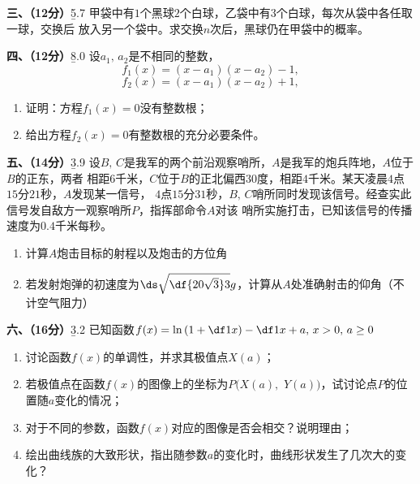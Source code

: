 \begin{frame}
	\linespread{1.5}
	\begin{exampleblock}{{\bf 三、（12分）}\hfill{\b 5.7}}
		甲袋中有$1$个黑球$2$个白球，乙袋中有$3$个白球，每次从袋中各任取一球，交换后
		放入另一个袋中。求交换$n$次后，黑球仍在甲袋中的概率。
	\end{exampleblock}
\end{frame}

\begin{frame}
	\linespread{1.2}
	\begin{exampleblock}{{\bf 四、（12分）}\hfill{\b 8.0}}
		设$a_1,\,a_2$是不相同的整数，
		$$f_1(x)=(x-a_1)(x-a_2)-1,$$
		$$f_2(x)=(x-a_1)(x-a_2)+1,$$
		\vspace{-1em}\pause
		\begin{enumerate}
		  \item 证明：方程$f_1(x)=0$没有整数根；\pause
		  \item 给出方程$f_2(x)=0$有整数根的充分必要条件。
		\end{enumerate}
	\end{exampleblock}
\end{frame}

\begin{frame}
	\linespread{1.0}
	\begin{exampleblock}{{\bf 五、（14分）}\hfill\hfill{\b 3.9}}
		设$B,\,C$是我军的两个前沿观察哨所，$A$是我军的炮兵阵地，$A$位于$B$的正东，两者
		相距$6$千米，$C$位于$B$的正北偏西$30$度，相距$4$千米。某天凌晨$4$点$15$分$21$秒，$A$发现某一信号，
		$4$点$15$分$31$秒，$B,\,C$哨所同时发现该信号。经查实此信号发自敌方一观察哨所$P$，指挥部命令$A$对该
		哨所实施打击，已知该信号的传播速度为$0.4$千米每秒。\pause
		\begin{enumerate}
		  \item 计算$A$炮击目标的射程以及炮击的方位角\pause
		  \item 若发射炮弹的初速度为$\ds\sqrt{\df{20\sqrt 3}3}g$，计算从$A$处准确射击的仰角（不计空气阻力）
		\end{enumerate}
	\end{exampleblock}
\end{frame}

\begin{frame}
	\linespread{1.2}
	\begin{exampleblock}{{\bf 六、（16分）}\hfill\hfill{\b 3.2}}
		已知函数$f(x)=\ln\left(1+\df 1x\right)-\df 1{x+a},\,x>0,\, a\geq 0$\pause
		\begin{enumerate}
		  \item 讨论函数$f(x)$的单调性，并求其极值点$X(a)$；\pause
		  \item 若极值点在函数$f(x)$的图像上的坐标为$P(X(a),$ $Y(a))$，试讨论点$P$的位置随$a$变化的情况；\pause
		  \item 对于不同的参数，函数$f(x)$对应的图像是否会相交？说明理由；\pause
		  \item 绘出曲线族的大致形状，指出随参数$a$的变化时，曲线形状发生了几次大的变化？
		\end{enumerate}
	\end{exampleblock}
\end{frame}


